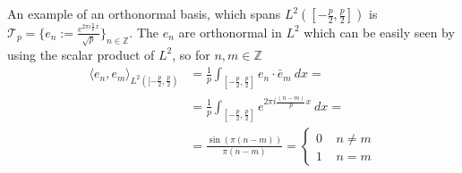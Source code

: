 \documentclass[a4paper]{article}
\begin{document}
An example of an orthonormal basis, which spans $L^2([-\frac{p}{2},
\frac{p}{2}])$ is $\mathcal{T}_p = \{e_n := \frac{e^{2\pi i
\frac{n}{p}x}}{\sqrt{p}}\}_{n\in\mathbb{Z}}$. The $e_n$ are orthonormal in $L^2$ which
can be easily seen by using the scalar product of $L^2$, so for $n, m \in
\mathbb{Z}$
\begin{align}
    \langle e_n, e_m\rangle_{L^2([-\frac{p}{2}, \frac{p}{2})} &=
    \frac{1}{p}\int_{[-\frac{p}{2}, \frac{p}{2}]}e_n \cdot \bar{e}_m \ dx=\\
    &=\frac{1}{p}\int_{[-\frac{p}{2}, \frac{p}{2}]} e^{2\pi i \frac{(n-m)}{p} x} \ dx=\\
    &=\frac{\sin(\pi (n-m))}{\pi(n-m)} =
    \begin{cases}
        0  \;\;\;\; n\neq m\\
        1 \;\;\;\;  n=m
    \end{cases}
\end{align}
\end{document}
